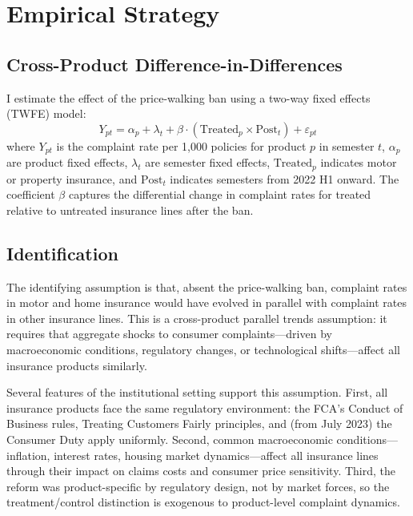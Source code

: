 \documentclass[12pt]{article}
\begin{document}



\section{Empirical Strategy}

\subsection{Cross-Product Difference-in-Differences}

I estimate the effect of the price-walking ban using a two-way fixed effects (TWFE) model:
\begin{equation}
Y_{pt} = \alpha_p + \lambda_t + \beta \cdot (\text{Treated}_p \times \text{Post}_t) + \varepsilon_{pt}
\label{eq:did}
\end{equation}
where $Y_{pt}$ is the complaint rate per 1,000 policies for product $p$ in semester $t$, $\alpha_p$ are product fixed effects, $\lambda_t$ are semester fixed effects, $\text{Treated}_p$ indicates motor or property insurance, and $\text{Post}_t$ indicates semesters from 2022 H1 onward. The coefficient $\beta$ captures the differential change in complaint rates for treated relative to untreated insurance lines after the ban.

\subsection{Identification}

The identifying assumption is that, absent the price-walking ban, complaint rates in motor and home insurance would have evolved in parallel with complaint rates in other insurance lines. This is a cross-product parallel trends assumption: it requires that aggregate shocks to consumer complaints---driven by macroeconomic conditions, regulatory changes, or technological shifts---affect all insurance products similarly.

Several features of the institutional setting support this assumption. First, all insurance products face the same regulatory environment: the FCA's Conduct of Business rules, Treating Customers Fairly principles, and (from July 2023) the Consumer Duty apply uniformly. Second, common macroeconomic conditions---inflation, interest rates, housing market dynamics---affect all insurance lines through their impact on claims costs and consumer price sensitivity. Third, the reform was product-specific by regulatory design, not by market forces, so the treatment/control distinction is exogenous to product-level complaint dynamics.
\end{document}
